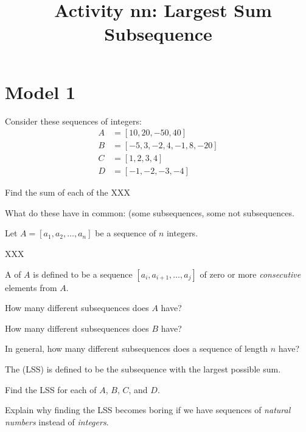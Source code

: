 \documentclass{tufte-handout}
\title{\thecourse\ Activity nn: Largest Sum Subsequence}
\date{}
\begin{document}
\maketitle

\section{Model 1}

Consider these sequences of integers:
\begin{align*}
  A &= [10, 20, -50, 40] \\
  B &= [-5, 3, -2, 4, -1, 8, -20] \\
  C &= [1, 2, 3, 4] \\
  D &= [-1, -2, -3, -4]
\end{align*}

\begin{questions}
  \item Find the sum of each of the XXX
  \item What do these have in common: (some subsequences, some
    not subsequences.
\end{questions}

Let $A = [a_1, a_2, \dots, a_n]$ be a sequence of $n$ integers.

XXX

\begin{defn}
  A  of $A$ is defined to be a sequence $[a_i,
  a_{i+1}, \dots, a_j]$ of zero or more \emph{consecutive} elements
  from $A$.
\end{defn}

\begin{questions}
  \item How many different subsequences does $A$ have?
  \item How many different subsequences does $B$ have?
  \item In general, how many different subsequences does a sequence of
    length $n$ have? 
\end{questions}

\begin{defn}
  The  (LSS) is defined to be the
  subsequence with the largest possible sum.
\end{defn}

\begin{questions}
  \item Find the LSS for each of $A$, $B$, $C$, and $D$.
  \item Explain why finding the LSS becomes boring if we have
    sequences of \emph{natural numbers} instead of \emph{integers}.
\end{questions}
\end{document}
